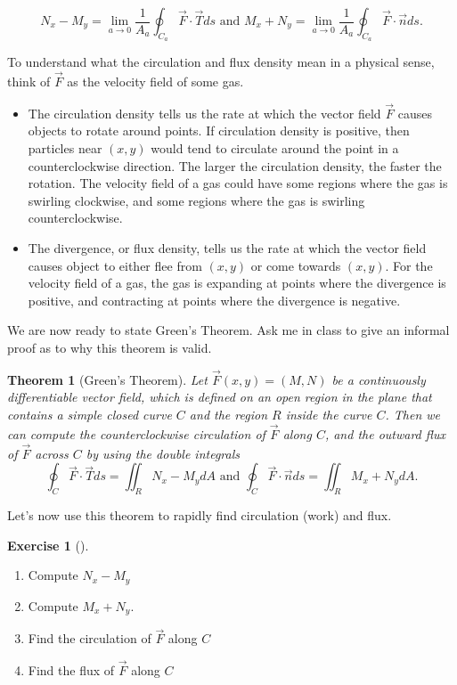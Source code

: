 \documentclass[10pt,]{book}
\theoremstyle{plain}
\newtheorem{theorem}{Theorem}[section]
\theoremstyle{definition}
\theoremstyle{definition}
\theoremstyle{definition}
\theoremstyle{definition}
\newtheorem{exploration}[project]{Exercise}
\theoremstyle{definition}
\numberwithin{equation}{section}
\begin{document}
\begin{equation*}
N_x-M_y=\lim_{a\to 0} \frac{1}{A_a}\oint_{C_a} \vec F \cdot \vec T ds  \text{ and }   M_x+N_y=\lim_{a\to 0} \frac{1}{A_a}\oint_{C_a} \vec F \cdot \vec n ds.
\end{equation*}
%
\par
To understand what the circulation and flux density mean in a physical sense, think of \(\vec F\) as the velocity field of some gas. \leavevmode%
\begin{itemize}[label=\textbullet]
\item{}The circulation density tells us the rate at which the vector field \(\vec F\) causes objects to rotate around points.  If circulation density is positive, then particles near \((x,y)\) would tend to circulate around the point in a counterclockwise direction. The larger the circulation density, the faster the rotation. The velocity field of a gas could have some regions where the gas is swirling clockwise, and some regions where the gas is swirling counterclockwise.%
\item{}The divergence, or flux density, tells us the rate at which the vector field causes object to either flee from \((x,y)\) or come towards \((x,y)\). For the velocity field of a gas, the gas is expanding at points where the divergence is positive, and contracting at points where the divergence is negative.%
\end{itemize}
%
\par
We are now ready to state Green's Theorem. Ask me in class to give an informal proof as to why this theorem is valid.%
\begin{theorem}[{Green's Theorem}]\label{theorem-12}
Let \(\vec F(x,y)=(M,N)\) be a continuously differentiable vector field, which is defined on an open region in the plane that contains a simple closed curve \(C\) and the region \(R\) inside the curve \(C\). Then we can compute the counterclockwise circulation of \(\vec F\) along \(C\), and the outward flux of \(\vec F\) across \(C\) by using the double integrals%
\begin{equation*}
\oint_{C} \vec F \cdot \vec T ds=\iint_R N_x-M_y dA 
\text{ and }   
\oint_{C} \vec F \cdot \vec n ds=\iint_R M_x+N_y dA.
\end{equation*}
%
\end{theorem}
Let's now use this theorem to rapidly find circulation (work) and flux.%
\begin{exploration}[]\label{exploration-271}
\leavevmode%
\begin{enumerate}[font=\bfseries,label=(\alph*),ref=\alph*]
\item\label{task-736} Compute \(N_x-M_y\)%
\item\label{task-737} Compute \(M_x+N_y\).%
\item\label{task-738} Find the circulation of \(\vec F\) along \(C\)%
\item\label{task-739} Find the flux of \(\vec F\) along \(C\)%
\end{enumerate}
\end{exploration}
\end{document}
